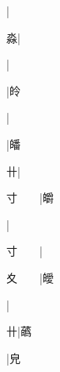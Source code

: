 \begin{multicols}{2}
{{\cjk{}{\cnsym{}　}{\cnsym{}　}{\cnsym{}　}}|{}\par
{\cjk{}{\cnsym{}　}{\cnsym{}　}淼}|{}\par
{\cjk{}{\cnsym{}　}{\cnsym{}　}{\cnsym{}　}}|{}\par
{\cjk{}{\cnsym{}　}{\cnsym{}　}{\cnsym{}　}}|{\cjk{}皊}\par
{\cjk{}{\cnsym{}　}{\cnsym{}　}{\cnsym{}　}}|{}\par
{\cjk{}{\cnsym{}　}{\cnsym{}　}{\cnsym{}　}}|{\cjk{}皤}\par
{\cjk{}{\cnsym{}　}{\cnsym{}　}卄}|{}\par
{\cjk{}寸{\cnsym{}　}{\cnsym{}　}}|{\cjk{}皭}\par
{}|{}\par
{\cjk{}寸{\cnsym{}　}{\cnsym{}　}}|{}\par
{\cjk{}夊{\cnsym{}　}{\cnsym{}　}}|{\cjk{}皧}\par
{\cjk{}{\cnsym{}　}{\cnsym{}　}{\cnsym{}　}}|{}\par
{\cjk{}{\cnsym{}　}{\cnsym{}　}卄}|{\cjk{}蘤}\par
{\cjk{}{\cnsym{}　}{\cnsym{}　}{\cnsym{}　}}|{\cjk{}皃}\par
}
\end{multicols}
